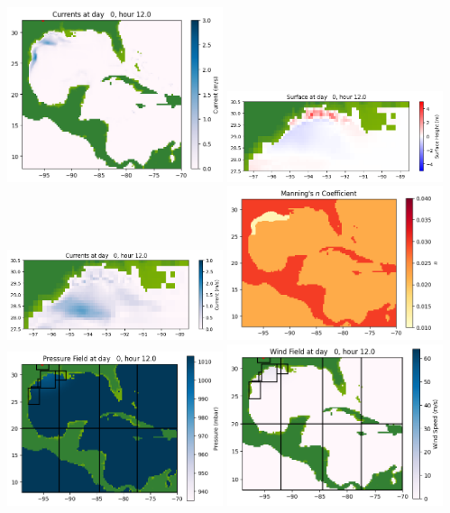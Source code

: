 \documentclass[11pt]{article}
\begin{document}
\includegraphics[width=0.475\textwidth]{frame0014fig1002.png}
\vskip 10pt 
\includegraphics[width=0.475\textwidth]{frame0014fig1003.png}
\includegraphics[width=0.475\textwidth]{frame0014fig1004.png}
\vskip 10pt 
\includegraphics[width=0.475\textwidth]{frame0014fig1005.png}
\includegraphics[width=0.475\textwidth]{frame0014fig1006.png}
\vskip 10pt 
\includegraphics[width=0.475\textwidth]{frame0014fig1007.png}
\end{document}
